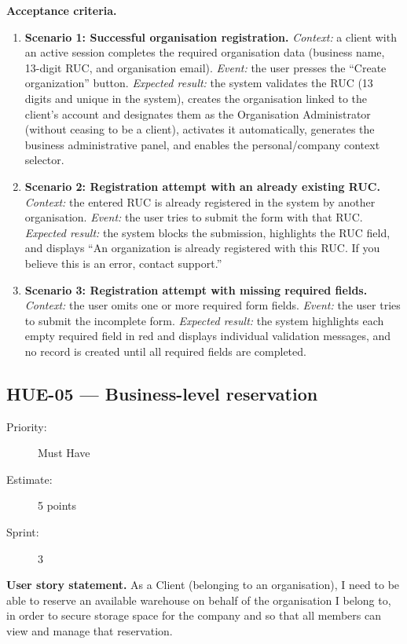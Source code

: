 \documentclass[11pt,a4paper,oneside]{report}
\begin{document}
\textbf{Acceptance criteria.}
\begin{enumerate}
\item \textbf{Scenario 1: Successful organisation registration.} \emph{Context:} a client with an active session completes the required organisation data (business name, 13-digit RUC, and organisation email). \emph{Event:} the user presses the ``Create organization'' button. \emph{Expected result:} the system validates the RUC (13 digits and unique in the system), creates the organisation linked to the client's account and designates them as the Organisation Administrator (without ceasing to be a client), activates it automatically, generates the business administrative panel, and enables the personal/company context selector.
\item \textbf{Scenario 2: Registration attempt with an already existing RUC.} \emph{Context:} the entered RUC is already registered in the system by another organisation. \emph{Event:} the user tries to submit the form with that RUC. \emph{Expected result:} the system blocks the submission, highlights the RUC field, and displays ``An organization is already registered with this RUC. If you believe this is an error, contact support.''
\item \textbf{Scenario 3: Registration attempt with missing required fields.} \emph{Context:} the user omits one or more required form fields. \emph{Event:} the user tries to submit the incomplete form. \emph{Expected result:} the system highlights each empty required field in red and displays individual validation messages, and no record is created until all required fields are completed.
\end{enumerate}

\subsection{HUE-05 --- Business-level reservation}
\label{req:HUE-05}
\begin{description}
\item[Priority:] Must Have \quad \item[Estimate:] 5 points \quad \item[Sprint:] 3
\end{description}

\textbf{User story statement.} As a Client (belonging to an organisation), I need to be able to reserve an available warehouse on behalf of the organisation I belong to, in order to secure storage space for the company and so that all members can view and manage that reservation.
\end{document}
